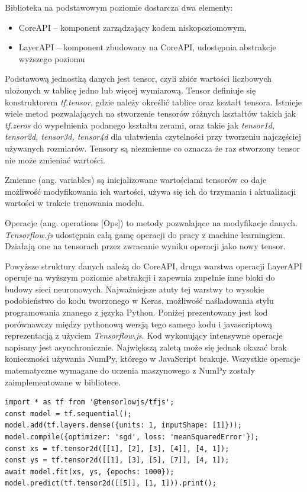 \documentclass[12pt,a4paper,twoside,titlepage,openright]{book}
\begin{document}
Biblioteka na podstawowym poziomie dostarcza dwa elementy:
\begin{itemize}
\item CoreAPI -- komponent zarządzający kodem niskopoziomowym,
\item LayerAPI -- komponent zbudowany na CoreAPI, udostępnia abstrakcje wyższego poziomu
\end{itemize}

Podstawową jednostką danych jest tensor, czyli zbiór wartości liczbowych ułożonych w tablicę jedno lub więcej wymiarową. Tensor definiuje się konstruktorem \textit{tf.tensor}, gdzie należy określić tablice oraz kształt tensora. Istnieje wiele metod pozwalających na stworzenie tensorów różnych kształtów takich jak \textit{tf.zeros} do wypełnienia podanego kształtu zerami, oraz takie jak \textit{tensor1d, tensor2d, tensor3d, tensor4d} dla ułatwienia czytelności przy tworzeniu najczęściej używanych rozmiarów.
Tensory są niezmienne co oznacza że raz stworzony tensor nie może zmieniać wartości. 

Zmienne (ang. variables) są inicjalizowane wartościami tensorów co daje możliwość modyfikowania ich wartości, używa się ich do trzymania i aktualizacji wartości w trakcie trenowania modelu.

Operacje (ang. operations [Ops]) to metody pozwalające na modyfikacje danych. \textit{Tensorflow.js} udostępnia całą gamę operacji do pracy z machine learningiem. Działają one na tensorach przez zwracanie wyniku operacji jako nowy tensor.

Powyższe struktury danych należą do CoreAPI, druga warstwa operacji LayerAPI operuje na wyższym poziomie abstrakcji i zapewnia zupełnie inne bloki do budowy sieci neuronowych. Najważniejsze atuty tej warstwy to wysokie podobieństwo do kodu tworzonego w Keras, możliwość naśladowania stylu programowania znanego z języka Python. Poniżej prezentowany jest kod porównawczy między pythonową wersją tego samego kodu i javascriptową reprezentacją z użyciem \textit{Tensorflow.js}. Kod wykonujący intensywne operacje napisany jest asynchronicznie. Największą zaletą może się jednak okazać brak konieczności używania NumPy, którego w JavaScript brakuje. Wszystkie operacje matematyczne wymagane do uczenia maszynowego z NumPy zostały zaimplementowane w bibliotece. \cite{siteTensorflowJSConcepts}

\noindent
\begin{minipage}{\linewidth}
\begin{lstlisting}[caption=Proste operacje w JavaScript z Tensorflow.js, label=lst:test]
import * as tf from '@tensorlowjs/tfjs';
const model = tf.sequential();
model.add(tf.layers.dense({units: 1, inputShape: [1]}));
model.compile({optimizer: 'sgd', loss: 'meanSquaredError'});
const xs = tf.tensor2d([[1], [2], [3], [4]], [4, 1]);
const ys = tf.tensor2d([[1], [3], [5], [7]], [4, 1]);
await model.fit(xs, ys, {epochs: 1000});
model.predict(tf.tensor2d([[5]], [1, 1])).print();
\end{lstlisting}
\end{minipage}
\end{document}
